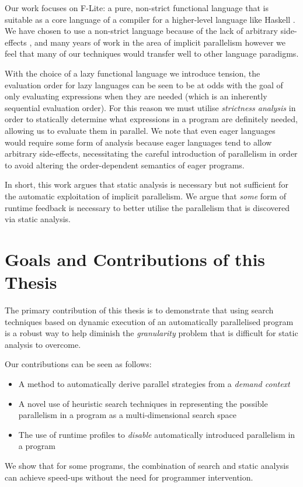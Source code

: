 Our work focuses on F-Lite: a pure, non-strict functional language that is
suitable as a core language of a compiler for a higher-level language like
Haskell \citep{naylor2010reduceron}. We have chosen to use a non-strict language
because of the lack of arbitrary side-effects \citep{whyFPmatters}, and many
years of work in the area of implicit parallelism \citep{hogen1992automatic,
PFPAnIntro, jones1993implicit} however we feel that many of our techniques
would transfer well to other language paradigms.

With the choice of a lazy functional language we introduce tension, the
evaluation order for lazy languages can be seen to be at odds with the goal of
only evaluating expressions when they are needed (which is an inherently
sequential evaluation order). For this reason we must utilise \emph{strictness
analysis} in order to statically determine what expressions in a program are
definitely needed, allowing us to evaluate them in parallel. We note that even
eager languages would require some form of analysis because eager languages
tend to allow arbitrary side-effects, necessitating the careful introduction of
parallelism in order to avoid altering the order-dependent semantics of eager
programs.

In short, this work argues that static analysis is necessary but not sufficient
for the automatic exploitation of implicit parallelism. We argue that
\emph{some} form of runtime feedback is necessary to better utilise the
parallelism that is discovered via static analysis.

\section{Goals and Contributions of this Thesis}

The primary contribution of this thesis is to demonstrate that using search techniques
based on dynamic execution of an automatically parallelised program is a robust
way to help diminish the \emph{granularity} problem that is difficult for
static analysis to overcome.

Our contributions can be seen as follows:

\begin{itemize}
    \item A method to automatically derive parallel strategies from a
            \emph{demand context}
    \item A novel use of heuristic search techniques in representing the
            possible parallelism in a program as a multi-dimensional search space
    \item The use of runtime profiles to \emph{disable} automatically introduced
            parallelism in a program
\end{itemize}

We show that for some programs, the combination of search and static analysis
can achieve speed-ups without the need for programmer intervention.

